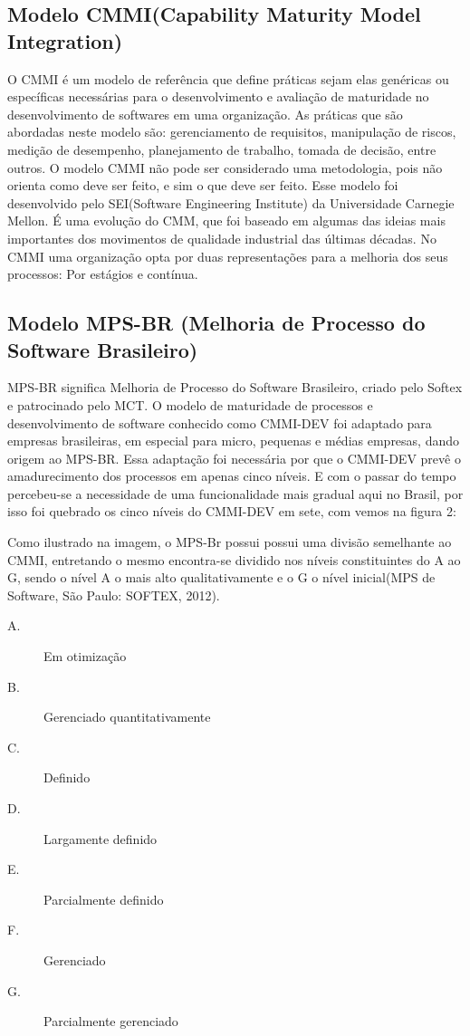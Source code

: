   \subsection{Modelo CMMI(Capability Maturity Model Integration)}
  O CMMI é um modelo de referência que define práticas sejam elas genéricas ou específicas necessárias para o desenvolvimento e avaliação de maturidade no desenvolvimento de softwares em uma organização. As práticas que são abordadas neste modelo são: gerenciamento de requisitos, manipulação de riscos, medição de desempenho, planejamento de trabalho, tomada de decisão, entre outros. O modelo CMMI não pode ser considerado uma metodologia, pois não orienta como deve ser feito, e sim o que deve ser feito. Esse modelo foi desenvolvido pelo SEI(Software Engineering Institute) da Universidade Carnegie Mellon. É uma evolução do CMM, que foi baseado em algumas das ideias mais importantes dos movimentos de qualidade industrial das últimas décadas.
No CMMI uma organização opta por duas representações para a melhoria dos seus processos: Por estágios e contínua.

  \subsection{Modelo MPS-BR (Melhoria de Processo do Software Brasileiro)}
MPS-BR significa Melhoria de Processo do Software Brasileiro, criado pelo Softex e patrocinado pelo MCT. O modelo de maturidade de processos e desenvolvimento de software conhecido como CMMI-DEV foi adaptado para empresas brasileiras, em especial para micro, pequenas e médias empresas, dando origem ao MPS-BR. Essa adaptação foi necessária por que o CMMI-DEV prevê o amadurecimento dos processos em apenas cinco níveis.				
E com o passar do tempo percebeu-se a necessidade de uma funcionalidade mais gradual aqui no Brasil, por isso foi quebrado os cinco níveis do CMMI-DEV em sete, com vemos na figura 2:

Como ilustrado na imagem, o MPS-Br possui possui uma divisão semelhante ao CMMI, entretando o mesmo encontra-se dividido nos níveis constituintes do A ao G, sendo o nível A o mais alto qualitativamente e o G o nível inicial(MPS de Software, São Paulo: SOFTEX, 2012).	
\begin{description}
\item[A.] Em otimização
\item[B.] Gerenciado quantitativamente
\item[C.] Definido
\item[D.] Largamente definido
\item[E.] Parcialmente definido
\item[F.] Gerenciado
\item[G.] Parcialmente gerenciado	
\end{description}			

